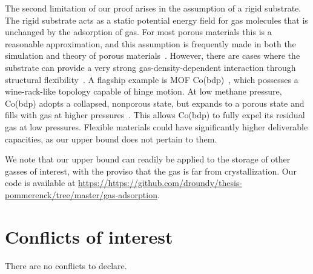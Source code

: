 \documentclass[twoside,twocolumn,9pt]{article}
\renewcommand{\refname}{Notes and references}
\newcommand\donereferees{\cbend}
\begin{document}
\donereferees

The second limitation of our proof arises in the assumption of a rigid
substrate. The rigid substrate acts as a static potential energy field for gas
molecules that is unchanged by the adsorption of gas. For most porous materials
this is a reasonable approximation, and this assumption is frequently made in
both the simulation and theory of porous materials~\cite{duren2009using}.
However, there are cases where the substrate can provide a very strong
gas-density-dependent interaction through structural
flexibility~\cite{schneemann2014flexible}. A flagship example is MOF
Co(bdp)~\cite{choi2008broadly}, which possesses a wine-rack-like topology
capable of hinge motion. At low methane pressure, Co(bdp) adopts a collapsed,
nonporous state, but expands to a porous state and fills with gas at higher
pressures~\cite{mason2015methane}. This allows Co(bdp) to fully expel its
residual gas at low pressures. Flexible materials could have significantly 
higher deliverable capacities, as our upper bound does not pertain to them.

We note that our upper bound can readily be applied to the storage of other
gasses of interest, with the proviso that the gas is far from crystallization.
Our code is available at \href{https://https://github.com/droundy/thesis-pommerenck/tree/master/gas-adsorption}{https://https://github.com/droundy/thesis-pommerenck/tree/master/gas-adsorption}.

\section*{Conflicts of interest}
There are no conflicts to declare.




\balance


\end{document}
